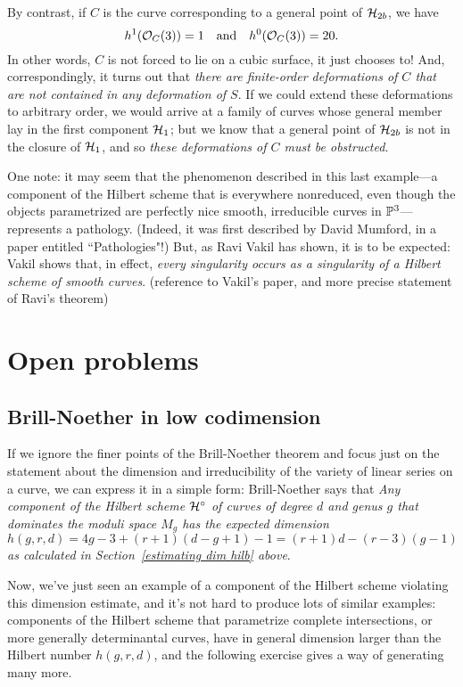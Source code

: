 By contrast, if $C$ is the curve corresponding to a general point of $\cH_{2b}$, we have
$$
h^1(\cO_C(3)) = 1 \quad \text{and} \quad h^0(\cO_C(3)) = 20.
$$
In other words, $C$ is not forced to lie on a cubic surface, it just chooses to! And, correspondingly, it turns out that \emph{there are finite-order deformations of $C$ that are not contained in any deformation of $S$}. If we could extend these deformations to arbitrary order, we would arrive at a family of curves whose general member lay in the first component $\cH_1$; but we know that a general point of $\cH_{2b}$ is not in the closure of $\cH_1$, and so \emph{these deformations of $C$ must be obstructed}.

One note: it may seem that the phenomenon described in this last example---a component of the Hilbert scheme that is everywhere nonreduced, even though the objects parametrized are perfectly nice smooth, irreducible curves in $\PP^3$---represents a pathology. (Indeed, it was first described by David Mumford, in a paper entitled ``Pathologies"!) But, as Ravi Vakil has shown, it is to be expected: Vakil shows that, in effect, \emph{every singularity occurs as a singularity of a Hilbert scheme of smooth curves}. (reference to Vakil's paper, and more precise statement of Ravi's theorem)
 


\section{Open problems}

\subsection{Brill-Noether in low codimension}

If we ignore the finer points of the Brill-Noether theorem and focus just on the statement about the dimension and irreducibility of the variety of linear series on a curve, we can express it in a simple form: Brill-Noether says that \emph{Any component of the Hilbert scheme $\cH^\circ$ of curves of degree $d$ and genus $g$ that dominates the moduli space $M_g$ has the expected dimension 
$$
h(g,r,d) = 4g-3 + (r+1)(d-g+1) - 1 = (r+1)d - (r-3)(g-1)
$$
 as calculated in Section~\ref{estimating dim hilb} above}.
 
 
Now, we've just seen an example of a component of the Hilbert scheme violating this dimension estimate, and it's not hard to produce lots of similar examples: components of the Hilbert scheme that parametrize complete intersections, or more generally determinantal curves, have in general dimension larger than the Hilbert number $h(g,r,d)$, and the following exercise gives a way of generating many more.

